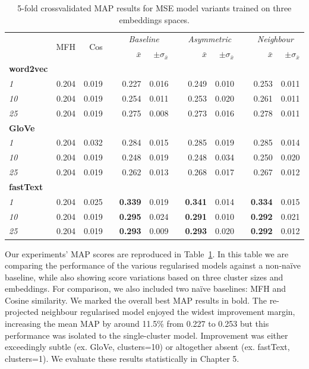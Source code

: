 \begin{table}\centering
\begin{tabular}{@{}lrrcrrcrrcrr@{}}\toprule
& \multirow{2}{*}{MFH} & \multirow{2}{*}{Cos} & \phantom{a} &  \multicolumn{2}{c}{\textit{Baseline}} & \phantom{a} & \multicolumn{2}{c}{\textit{Asymmetric}} & \phantom{a} & \multicolumn{2}{c}{\textit{Neighbour}}\\
\cmidrule{5-6} \cmidrule{8-9} \cmidrule{11-12}
&  &  && $\bar{x}$ & $\pm\sigma_{\bar{x}}$ && $\bar{x}$ & $\pm\sigma_{\bar{x}}$ && $\bar{x}$ & $\pm\sigma_{\bar{x}}$ \\ \midrule
\textbf{word2vec}\\
\textit{1} & 0.204 & 0.019 && 0.227 & 0.016 && 0.249 & 0.010 && 0.253 & 0.011 \\
\textit{10} & 0.204 & 0.019 && 0.254 & 0.011 && 0.253 & 0.020 && 0.261 & 0.011 \\
\textit{25} & 0.204 & 0.019 && 0.275 & 0.008 && 0.273 & 0.016 && 0.278 & 0.011 \\
\cmidrule{2-12}
\textbf{GloVe}\\
\textit{1} & 0.204 & 0.032 && 0.284 & 0.015 && 0.285 & 0.019 && 0.285 & 0.014 \\
\textit{10} & 0.204 & 0.019 && 0.248 & 0.019 && 0.248 & 0.034 && 0.250 & 0.020 \\
\textit{25} & 0.204 & 0.019 && 0.262 & 0.013 && 0.268 & 0.017 && 0.267 & 0.012 \\
\cmidrule{2-12}
\textbf{fastText}\\
\textit{1} & 0.204 & 0.025 && \textbf{0.339} & 0.019 && \textbf{0.341} & 0.014 && \textbf{0.334} & 0.015 \\
\textit{10} & 0.204 & 0.019 && \textbf{0.295} & 0.024 && \textbf{0.291} & 0.010 && \textbf{0.292} & 0.021 \\
\textit{25} & 0.204 & 0.019 && \textbf{0.293} & 0.009 && \textbf{0.293} & 0.020 && \textbf{0.292} & 0.012 \\
\bottomrule
\end{tabular}
\caption{5-fold crossvalidated \ac{MAP} results for \ac{MSE} model variants trained on three embeddings spaces.}\label{tab:map_mse}
\end{table}
Our experiments' \ac{MAP} scores are reproduced in Table~\ref{tab:map_mse}.  In this table we are comparing the performance of the various regularised models against a non-na\"ive baseline, while also showing score variations based on three cluster sizes and embeddings.  For comparison, we also included two na\"ive baselines: MFH and Cosine similarity.  We marked the overall best \ac{MAP} results in bold.  The re-projected neighbour regularised model enjoyed the widest improvement margin, increasing the mean \ac{MAP} by around 11.5\% from 0.227 to 0.253 but this performance was isolated to the single-cluster model.  Improvement was either exceedingly subtle (ex. GloVe, clusters=10) or altogether absent (ex. fastText, clusters=1).  We evaluate these results statistically in Chapter 5.

